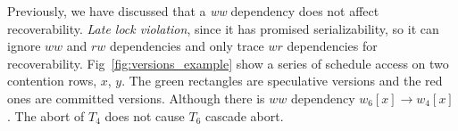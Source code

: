 \documentclass[conference]{IEEEtran}
\begin{document}
Previously, we have discussed that a \emph{ww} dependency does not affect recoverability.
\emph{Late lock violation}, since it has promised serializability, so it can ignore ${ww}$ and ${rw}$ dependencies and only trace ${wr}$ dependencies for recoverability.
Fig~\ref{fig:versions_example} show a series of schedule access on two contention rows, ${x}$, ${y}$.
The green rectangles are speculative versions and the red ones are committed versions.
Although there is ${ww}$ dependency ${w_6[x] \rightarrow w_4[x]}$.
The abort of $T_4$ does not cause ${T_6}$ cascade abort.
\begin{figure}[htbp]
  \centering
\end{figure}
\end{document}
